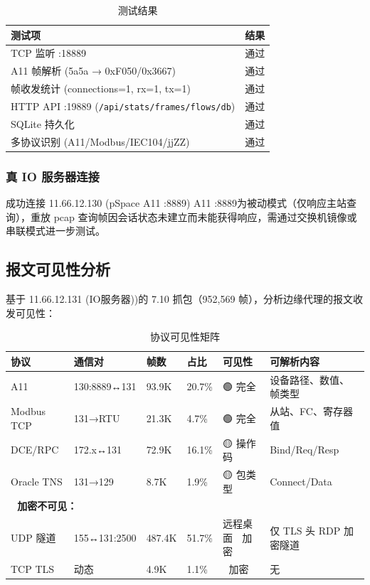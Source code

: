 \documentclass[12pt,a4paper]{ctexart}
\newcommand{\code}[1]{\texttt{\small #1}}
\begin{document}
\begin{table}[H]\centering
\caption{测试结果}
\begin{tabular}{p{5cm} p{2cm}}
\toprule
\textbf{测试项} & \textbf{结果} \\
\midrule
TCP 监听 :18889 & 通过 \\
A11 帧解析 (5a5a → 0xF050/0x3667) & 通过 \\
帧收发统计 (connections=1, rx=1, tx=1) & 通过 \\
HTTP API :19889 (\code{/api/stats/frames/flows/db}) & 通过 \\
SQLite 持久化 & 通过 \\
多协议识别 (A11/Modbus/IEC104/jjZZ) & 通过 \\
\bottomrule
\end{tabular}
\end{table}

\subsubsection{真 IO 服务器连接}

成功连接 11.66.12.130 (pSpace A11 :8889) A11 :8889为被动模式（仅响应主站查询），重放 pcap 查询帧因会话状态未建立而未能获得响应，需通过交换机镜像或串联模式进一步测试。

\subsection{报文可见性分析}

基于 11.66.12.131 (IO服务器))的 7.10 抓包（952,569 帧），分析边缘代理的报文收发可见性：

\begin{table}[H]\centering
\caption{协议可见性矩阵}
\begin{tabular}{p{2cm} p{2.2cm} p{1.2cm} p{1.5cm} p{1.8cm} p{3.5cm}}
\toprule
\textbf{协议} & \textbf{通信对} & \textbf{帧数} & \textbf{占比} & \textbf{可见性} & \textbf{可解析内容} \\
\midrule
A11 & 130:8889↔131 & 93.9K & 20.7\% & 🟢 完全 & 设备路径、数值、帧类型 \\
Modbus TCP & 131→RTU & 21.3K & 4.7\% & 🟢 完全 & 从站、FC、寄存器值 \\
DCE/RPC & 172.x↔131 & 72.9K & 16.1\% & 🟡 操作码 & Bind/Req/Resp \\
Oracle TNS & 131→129 & 8.7K & 1.9\% & 🟡 包类型 & Connect/Data \\
\midrule
\multicolumn{6}{l}{\textbf{🔴 加密不可见：}} \\
UDP 隧道 & 155↔131:2500 & 487.4K & 51.7\% & 远程桌面 🔴 加密 & 仅 TLS 头 RDP 加密隧道 \\
TCP TLS & 动态 & 4.9K & 1.1\% & 🔴 加密 & 无 \\
\bottomrule
\end{tabular}
\end{table}
\end{document}
